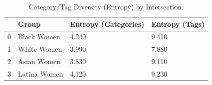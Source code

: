 \begin{table}[htbp]
\centering
\caption{Category/Tag Diversity (Entropy) by Intersection.}
\label{tab:eda_entropy_by_group}
\begin{tabular}{llll}
\toprule
 & Group & Entropy (Categories) & Entropy (Tags) \\
\midrule
0 & Black Women & 4.240 & 9.410 \\
1 & White Women & 3.990 & 7.880 \\
2 & Asian Women & 3.830 & 9.110 \\
3 & Latina Women & 4.120 & 9.230 \\
\bottomrule
\end{tabular}

\end{table}